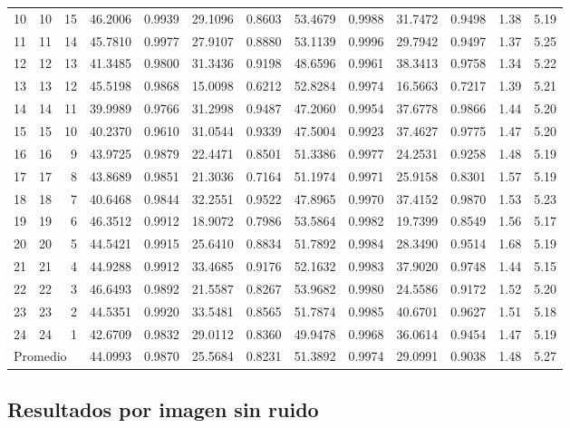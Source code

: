 \documentclass[11pt,a4paper]{article}
\begin{document}
\begin{landscape}
{\begin{tabular}{r r r r r r r r r r r r r}
10 & 10 & 15 & 46.2006 & 0.9939 & 29.1096 & 0.8603 & 53.4679 & 0.9988 & 31.7472 & 0.9498 & 1.38 & 5.19 \\
11 & 11 & 14 & 45.7810 & 0.9977 & 27.9107 & 0.8880 & 53.1139 & 0.9996 & 29.7942 & 0.9497 & 1.37 & 5.25 \\
12 & 12 & 13 & 41.3485 & 0.9800 & 31.3436 & 0.9198 & 48.6596 & 0.9961 & 38.3413 & 0.9758 & 1.34 & 5.22 \\
13 & 13 & 12 & 45.5198 & 0.9868 & 15.0098 & 0.6212 & 52.8284 & 0.9974 & 16.5663 & 0.7217 & 1.39 & 5.21 \\
14 & 14 & 11 & 39.9989 & 0.9766 & 31.2998 & 0.9487 & 47.2060 & 0.9954 & 37.6778 & 0.9866 & 1.44 & 5.20 \\
15 & 15 & 10 & 40.2370 & 0.9610 & 31.0544 & 0.9339 & 47.5004 & 0.9923 & 37.4627 & 0.9775 & 1.47 & 5.20 \\
16 & 16 & 9 & 43.9725 & 0.9879 & 22.4471 & 0.8501 & 51.3386 & 0.9977 & 24.2531 & 0.9258 & 1.48 & 5.19 \\
17 & 17 & 8 & 43.8689 & 0.9851 & 21.3036 & 0.7164 & 51.1974 & 0.9971 & 25.9158 & 0.8301 & 1.57 & 5.19 \\
18 & 18 & 7 & 40.6468 & 0.9844 & 32.2551 & 0.9522 & 47.8965 & 0.9970 & 37.4152 & 0.9870 & 1.53 & 5.23 \\
19 & 19 & 6 & 46.3512 & 0.9912 & 18.9072 & 0.7986 & 53.5864 & 0.9982 & 19.7399 & 0.8549 & 1.56 & 5.17 \\
20 & 20 & 5 & 44.5421 & 0.9915 & 25.6410 & 0.8834 & 51.7892 & 0.9984 & 28.3490 & 0.9514 & 1.68 & 5.19 \\
21 & 21 & 4 & 44.9288 & 0.9912 & 33.4685 & 0.9176 & 52.1632 & 0.9983 & 37.9020 & 0.9748 & 1.44 & 5.15 \\
22 & 22 & 3 & 46.6493 & 0.9892 & 21.5587 & 0.8267 & 53.9682 & 0.9980 & 24.5586 & 0.9172 & 1.52 & 5.20 \\
23 & 23 & 2 & 44.5351 & 0.9920 & 33.5481 & 0.8565 & 51.7874 & 0.9985 & 40.6701 & 0.9627 & 1.51 & 5.18 \\
24 & 24 & 1 & 42.6709 & 0.9832 & 29.0112 & 0.8360 & 49.9478 & 0.9968 & 36.0614 & 0.9454 & 1.47 & 5.19 \\
\midrule
\multicolumn{3}{l}{Promedio} & 44.0993 & 0.9870 & 25.5684 & 0.8231 & 51.3892 & 0.9974 & 29.0991 & 0.9038 & 1.48 & 5.27 \\
\bottomrule
\end{tabular}%
}
\end{landscape}

\subsection{Resultados por imagen sin ruido}
\label{app:tabla-sin-ruido}
\end{document}
